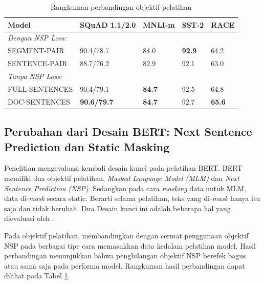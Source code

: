     \begin{table}[tb]
        \centering
        \caption{Rangkuman perbandingan objektif pelatihan \parencite{Liu_Ott_Goyal_Du_Joshi_Chen_Levy_Lewis_Zettlemoyer_Stoyanov_2019} }
        \begin{tabular}{|l|l|l|l|l|}
            \hline
            \textbf{Model} & \textbf{SQuAD 1.1/2.0} & \textbf{MNLI-m} & \textbf{SST-2} & \textbf{RACE} \\ \hline
            \multicolumn{5}{|l|}{\textit{Dengan NSP Loss:}}                                            \\ \hline
            SEGMENT-PAIR   & 90.4/78.7              & 84.0            & \textbf{92.9}  & 64.2          \\ \hline
            SENTENCE-PAIR  & 88.7/76.2              & 82.9            & 92.1           & 63.0          \\ \hline
            \multicolumn{5}{|l|}{\textit{Tanpa NSP Loss:}}                                             \\ \hline
            FULL-SENTENCES & 90.4/79.1              & \textbf{84.7}   & 92.5           & 64.8          \\ \hline
            DOC-SENTENCES  & \textbf{90.6/79.7}     & \textbf{84.7}   & 92.7           & \textbf{65.6} \\ \hline
        \end{tabular}
        \label{tab:rangkuman_roberta_1}
    \end{table}

    \subsection{Perubahan dari Desain BERT: Next Sentence Prediction dan Static Masking}
    Penelitian \parencite{Liu_Ott_Goyal_Du_Joshi_Chen_Levy_Lewis_Zettlemoyer_Stoyanov_2019} mengevaluasi kembali desain kunci pada pelatihan BERT. BERT memiliki dua objektif pelatihan, \textit{Masked Language Model (MLM)} dan \textit{Next Sentence Prediction (NSP)}. Sedangkan pada cara \textit{masking} data untuk MLM, data di-\textit{mask} secara static. Berarti selama pelatihan, teks yang di-\textit{mask} hanya itu saja dan tidak berubah. Dua Desain kunci ini adalah beberapa hal yang dievaluasi oleh \parencite{Liu_Ott_Goyal_Du_Joshi_Chen_Levy_Lewis_Zettlemoyer_Stoyanov_2019}.

    Pada objektif pelatihan, \parencite{Liu_Ott_Goyal_Du_Joshi_Chen_Levy_Lewis_Zettlemoyer_Stoyanov_2019} membandingkan dengan cermat penggunaan objektif NSP pada berbagai tipe cara memasukkan data kedalam pelatihan model. Hasil perbandingan menunjukkan bahwa penghilangan objektif NSP berefek bagus atau sama saja pada performa model. Rangkuman hasil perbandingan dapat dilihat pada Tabel \ref{tab:rangkuman_roberta_1}.

